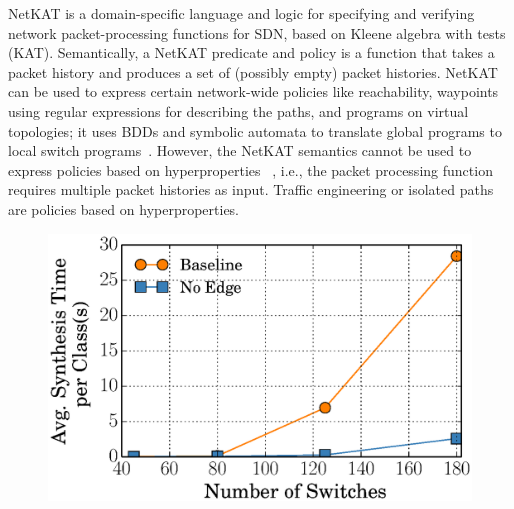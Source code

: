 NetKAT is a domain-specific language and logic for 
specifying and verifying network packet-processing functions
for SDN, based on Kleene algebra with tests (KAT). Semantically,
a NetKAT predicate and policy is a function that takes a packet
history and produces a set of (possibly empty) packet histories. 
NetKAT can be used to express certain network-wide policies like 
reachability, waypoints using regular expressions for describing the paths, 
and programs on virtual topologies; it uses
BDDs and symbolic automata to translate global programs to local
switch programs~\cite{netkatcompiler}. 
However, the NetKAT semantics
cannot be used to express policies based on hyperproperties
~\cite{hyperproperties}, i.e., 
the packet processing function requires multiple packet histories
as input. Traffic engineering or isolated paths are policies
based on hyperproperties. 
\begin{figure}[t]
	\centering
	\includegraphics[width=0.6\columnwidth]{figures/linkTopology.eps}
	\label{fig:link-capacity}
\end{figure}


